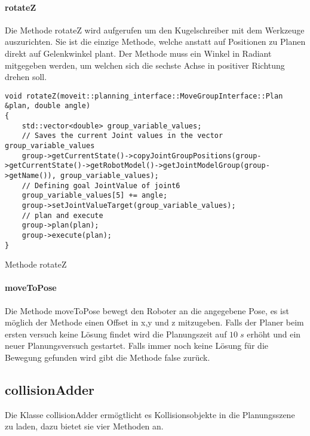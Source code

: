 \paragraph{rotateZ}
Die Methode rotateZ wird aufgerufen um den Kugelschreiber mit dem Werkzeuge auszurichten. Sie ist die einzige Methode, welche anstatt auf Positionen zu Planen direkt auf Gelenkwinkel plant. Der Methode muss ein Winkel in Radiant mitgegeben werden, um welchen sich die sechste Achse in positiver Richtung drehen soll.
\begin{code}
	\begin{verbatim}
void rotateZ(moveit::planning_interface::MoveGroupInterface::Plan &plan, double angle)
{
	std::vector<double> group_variable_values;
	// Saves the current Joint values in the vector group_variable_values
	group->getCurrentState()->copyJointGroupPositions(group->getCurrentState()->getRobotModel()->getJointModelGroup(group->getName()), group_variable_values);
	// Defining goal JointValue of joint6
	group_variable_values[5] += angle;
	group->setJointValueTarget(group_variable_values);
	// plan and execute
	group->plan(plan);
	group->execute(plan);
}
	\end{verbatim}
\vspace{-10pt}
\caption{Methode rotateZ}
\label{code:methRotz}
\end{code}

\paragraph{moveToPose}
Die Methode moveToPose bewegt den Roboter an die angegebene Pose, es ist möglich der Methode einen Offset in x,y und z mitzugeben. Falls der Planer beim ersten versuch keine Lösung findet wird die Planungszeit auf $10\;s$ erhöht und ein neuer Planungsversuch gestartet. Falls immer noch keine Lösung für die Bewegung gefunden wird gibt die Methode false zurück.

\subsection{collisionAdder}
Die Klasse collisionAdder ermögtlicht es Kollisionsobjekte in die Planungsszene zu laden, dazu bietet sie vier Methoden an.

